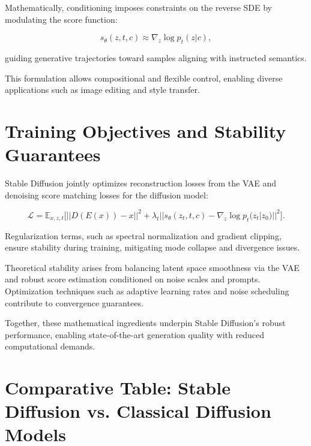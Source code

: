 \documentclass[a4paper,12pt,oneside]{memoir}
\begin{document}
Mathematically, conditioning imposes constraints on the reverse SDE by modulating the score function:

\[
s_\theta(z,t,c) \approx \nabla_z \log p_t(z | c),
\]

guiding generative trajectories toward samples aligning with instructed semantics.

This formulation allows compositional and flexible control, enabling diverse applications such as image editing and style transfer.

\section{Training Objectives and Stability Guarantees}

Stable Diffusion jointly optimizes reconstruction losses from the VAE and denoising score matching losses for the diffusion model:

\[
\mathcal{L} = \mathbb{E}_{x,z,t} \big[ || D(E(x)) - x ||^2 + \lambda_t || s_\theta(z_t, t, c) - \nabla_z \log p_t(z_t | z_0) ||^2 \big].
\]

Regularization terms, such as spectral normalization and gradient clipping, ensure stability during training, mitigating mode collapse and divergence issues.

Theoretical stability arises from balancing latent space smoothness via the VAE and robust score estimation conditioned on noise scales and prompts. Optimization techniques such as adaptive learning rates and noise scheduling contribute to convergence guarantees.

Together, these mathematical ingredients underpin Stable Diffusion’s robust performance, enabling state-of-the-art generation quality with reduced computational demands.

\section{Comparative Table: Stable Diffusion vs. Classical Diffusion Models}

\begin{table}[h]
\centering
{}
\caption{Comparative Analysis of Stable Diffusion vs. Classical Diffusion Models}
\end{table}
\end{document}
